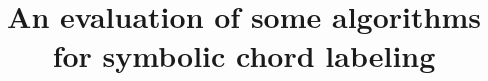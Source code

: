 \documentclass[english]{article}
\begin{document}
\graphicspath{{figs/}{data/}}

\title{An evaluation of some algorithms for symbolic chord labeling}

\author{}{}{}{}


\begin{sumario}

\end{sumario}






\end{document}
